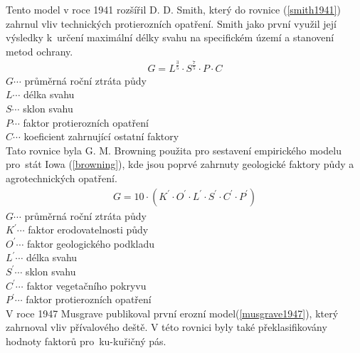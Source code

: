Tento model v roce 1941 rozšířil D. D. Smith, který do rovnice
(\ref{smith1941}) zahrnul vliv technických protierozních
opatření. Smith jako první využil její výsledky k~určení
maximální délky svahu na specifickém území a stanovení metod
ochrany.\cite{Smith1941}
\begin{align}
   \label{smith1941} G=L^{\frac{3}{5}}\cdot S^{\frac{7}{5}}\cdot P\cdot C
\end{align}
\hspace*{2cm}$G \cdots$ průměrná roční ztráta půdy\\
\hspace*{2cm}$L \cdots$ délka svahu \\
\hspace*{2cm}$S \cdots$ sklon svahu \\
\hspace*{2cm}$P \cdots$ faktor protierozních opatření \\
\hspace*{2cm}$C \cdots$ koeficient zahrnující ostatní faktory \\

Tato rovnice byla G. M. Browning použita pro sestavení empirického
modelu pro~stát Iowa (\ref{browning}), kde jsou poprvé zahrnuty
geologické faktory půdy a agrotechnických opatření.\cite{browning1947}
\begin{align}
   \label{browning} G=10\cdot\left( K^{\prime}\cdot O^{\prime}\cdot  L^{\prime}\cdot S^{\prime}\cdot C^{\prime}\cdot P^{\prime} \right)
\end{align}
\hspace*{2cm}$G \cdots$ průměrná roční ztráta půdy\\
\hspace*{2cm}$K^{\prime} \cdots$ faktor erodovatelnosti půdy \\
\hspace*{2cm}$O^{\prime} \cdots$ faktor geologického podkladu \\
\hspace*{2cm}$L^{\prime} \cdots$ délka svahu \\
\hspace*{2cm}$S^{\prime} \cdots$ sklon svahu \\
\hspace*{2cm}$C^{\prime} \cdots$ faktor vegetačního pokryvu \\
\hspace*{2cm}$P^{\prime} \cdots$ faktor protierozních opatření \\

V roce 1947 Musgrave publikoval první erozní
model(\ref{musgrave1947}), který zahrnoval vliv přívalového deště. V
této rovnici byly také překlasifikovány hodnoty faktorů pro~ku-kuřičný
pás.\cite{MUSGRAVE1947}

